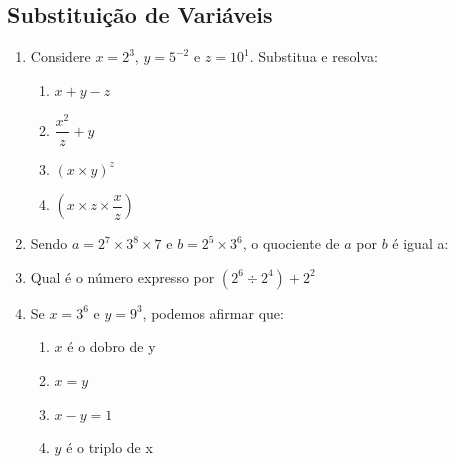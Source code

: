 \documentclass[a4paper,12pt]{article}
\begin{document}
\begin{multicols}{2}
		\section*{Substituição de Variáveis}\vspace{-5mm}
		\begin{enumerate}
			\item Considere $x = 2^3$, $y = 5^{-2}$ e $z = 10^1$. Substitua e resolva:\vspace{-5mm}
			\begin{multicols}{2}
			\begin{enumerate}[label=\roman*.]
				\item $x + y - z$
				\item $\dfrac{x^2}{z} + y$
				\item $(x \times y)^z$
				\item $(x \times z \times \dfrac{x}{z})$
			\end{enumerate}
			\end{multicols}
			\item Sendo $a=2^{7} \times 3^{8} \times 7$ e $b= 2^{5} \times 3^{6}$, o quociente de $a$ por $b$ é igual a:	\vspace{-4mm}
			\item Qual é o número expresso por $(2^{6} \div 2^{4}) + 2^{2}$\vspace{-4mm}
			\item Se $x=3^{6}$ e $y=9^{3}$, podemos afirmar que: \vspace{-5mm}
			\begin{multicols}{2}
				\begin{enumerate}				
					\item $x$ é o dobro de y   \item $x=y$
					\item $x-y=1$	\item $y$ é o triplo de x
				\end{enumerate}
			\end{multicols}
		

\end{enumerate}
\end{multicols}
\end{document}
